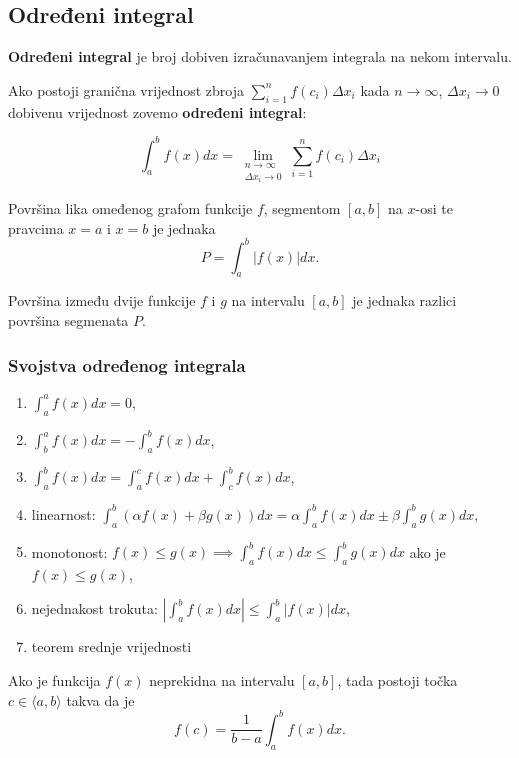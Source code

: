 \subsection{Određeni integral}

\textbf{Određeni integral} je broj dobiven izračunavanjem integrala na nekom
intervalu.

\begin{definition}
    Ako postoji granična vrijednost zbroja $\sum_{i=1}^n f(c_i)\Delta x_i$ kada $n \to \infty$, $\Delta x_i \to 0$ dobivenu vrijednost zovemo \textbf{određeni integral}:

    $$
        \int_a^b f(x)dx = \lim_{\substack{n \to \infty \\ \Delta x_i \to 0}} \sum_{i=1}^n f(c_i)\Delta x_i
    $$
\end{definition}

Površina lika omeđenog grafom funkcije $f$, segmentom $[a, b]$ na $x$-osi te pravcima $x=a$ i $x=b$ je jednaka
$$
    P=\int_a^b |f(x)| dx.
$$

Površina između dvije funkcije $f$ i $g$ na intervalu $[a, b]$ je jednaka razlici površina segmenata $P$.

\subsubsection{Svojstva određenog integrala}

\begin{enumerate}
    \item $\displaystyle \int_a^a f(x)dx = 0$,
    \item $\displaystyle \int_b^a f(x)dx = -\int_a^b f(x)dx$,
    \item $\displaystyle \int_a^b f(x)dx = \int_a^c f(x)dx + \int_c^b f(x)dx$,
    \item linearnost: $\displaystyle \int_a^b (\alpha f(x) + \beta g(x))dx = \alpha \int_a^b f(x)dx \pm \beta \int_a^b g(x)dx$,
    \item monotonost: $f(x) \leq g(x) \implies \displaystyle \int_a^b f(x)dx \leq \int_a^b g(x)dx$ ako je $f(x) \leq g(x)$,
    \item nejednakost trokuta: $\displaystyle \left|\int_a^b f(x)dx\right| \leq \int_a^b |f(x)|dx$,
    \item teorem srednje vrijednosti
\end{enumerate}

\begin{theorem}
    Ako je funkcija $f(x)$ neprekidna na intervalu $[a, b]$, tada postoji točka $c \in \langle a, b\rangle$ takva da je
    $$
        f(c) = \frac{1}{b-a}\int_a^b f(x)dx.
    $$
\end{theorem}

